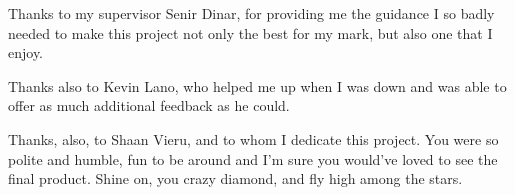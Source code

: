 
Thanks to my supervisor Senir Dinar, for providing me the guidance I so badly needed to make this project not only the best for my mark, but also one that I enjoy.

Thanks also to Kevin Lano, who helped me up when I was down and was able to offer as much additional feedback as he could.

Thanks, also, to Shaan Vieru, and to whom I dedicate this project. You were so polite and humble, fun to be around and I'm sure you would've loved to see the final product. Shine on, you crazy diamond, and fly high among the stars.